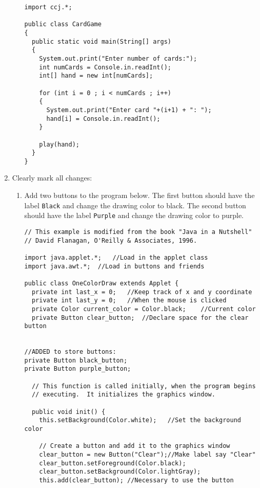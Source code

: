 \begin{enumerate}
\begin{enumerate}
\begin{verbatim}
import ccj.*;

public class CardGame
{
  public static void main(String[] args)
  {
    System.out.print("Enter number of cards:");
    int numCards = Console.in.readInt();
    int[] hand = new int[numCards];
     
    for (int i = 0 ; i < numCards ; i++)
    {
      System.out.print("Enter card "+(i+1) + ": ");
      hand[i] = Console.in.readInt();
    }
    
    play(hand);
  }
}
\end{verbatim}


      \end{enumerate}


        \item Clearly mark all changes:
                \begin{enumerate}
                        \item Add two buttons to the program below.  The
			    first button should have the label {\tt Black}
                            and change the drawing color to black.  The
	                    second button should have the label {\tt Purple}
                            and change the drawing color to purple.
\begin{verbatim}
// This example is modified from the book "Java in a Nutshell" 
// David Flanagan, O'Reilly & Associates, 1996.

import java.applet.*;	//Load in the applet class
import java.awt.*;	//Load in buttons and friends 

public class OneColorDraw extends Applet {
  private int last_x = 0;	//Keep track of x and y coordinate
  private int last_y = 0;	//When the mouse is clicked
  private Color current_color = Color.black;	//Current color
  private Button clear_button;	//Declare space for the clear button
  
  
//ADDED to store buttons:
private Button black_button;
private Button purple_button;
    
  // This function is called initially, when the program begins
  // executing.  It initializes the graphics window.
    
  public void init() {
    this.setBackground(Color.white);   //Set the background color
  
    // Create a button and add it to the graphics window
    clear_button = new Button("Clear");//Make label say "Clear"
    clear_button.setForeground(Color.black);
    clear_button.setBackground(Color.lightGray);
    this.add(clear_button);	//Necessary to use the button
    

\end{verbatim}
\end{enumerate}
\end{enumerate}
